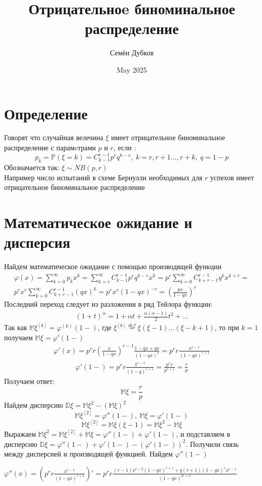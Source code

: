 \documentclass{article}
\title{Отрицательноe биноминальное распределение}
\author{Семён Дубков}
\date{May 2025}
\begin{document}
\maketitle
\fontsize{13}{15}\selectfont
\section{Определение}
Говорят что случайная велечина $\xi$ имеет отрицательное биноминальное распределение с парамeтрами $p$ и $r$, если :
\[
p_k = \mathbb{P}( \xi = k) = C_{k-1}^{r-1} p^rq^{k-r},\ k=r,r+1 \dots ,r+k, \ q = 1-p
\]
Обозначается так: $\xi \sim NB(p,r) $\\
Например число испытаний в схеме Бернулли необходимых для $r$ успехов имеет отрицательное биноминальное распределение

\section{Математическое ожидание и дисперсия}
Найдем математическое ожидание с помощью производящей функции
\begin{align*}
\varphi(x)=\sum_{k=0}^{\infty}p_kx^k = \sum_{k=r}^{\infty}C_{k-1}^{r-1}p^rq^{k-r}x^k=p^r\sum_{k=0}^{\infty}C_{k+r-1}^{r-1}q^kx^{k+r}=\\
p^rx^r\sum_{k=0}^{\infty}C_{k+r-1}^{r-1}(qx)^k=p^rx^r(1-qx)^{-r}=\left(\frac{px}{1-qx}\right)^r
\end{align*}
Последний переход следует из разложения в ряд Тейлора функции:
\begin{align*}
    (1+t)^{\alpha}=1+\alpha t+\frac{\alpha(\alpha-1)}{2}t^2+\dots
\end{align*}
Так как $\mathbb{M}\xi^{[k]}=\varphi^{(k)}(1-) $, где $\xi^{[k]}\overset{def}{=}\xi(\xi-1)\dots(\xi-k+1)$, то при $k=1$ получаем $\mathbb{M}\xi=\varphi'(1-)$
\begin{align*}
    \varphi'(x) = p^rr(\frac{x}{1-qx})^{r-1}\frac{1-qx+qx}{(1-qx)^2}=p^rr\frac{x^{r-1}}{(1-qx)^{r+1}}
\end{align*}
\begin{align*}
    \varphi'(1-)=p^rr\frac{1^{r-1}}{(1-q)^{r+1}}=\frac{p^rr}{p^{r+1}}=\frac{r}{p}
\end{align*}
Получаем ответ:
\[
\boxed{\mathbb{M}\xi=\frac{r}{p}}
\]
Найдем дисперсию $\mathbb{D\xi}=\mathbb{M}\xi^{2}-(\mathbb{M\xi})^2$
\[
\mathbb{M}\xi^{[2]}=\varphi''(1-),\ \mathbb{M}\xi=\varphi'(1-)
\]
\[
\mathbb{M}\xi^{[2]}=\mathbb{M}\xi(\xi-1)=\mathbb{M}\xi^2-\mathbb{M}\xi
\]
Выражаем $\mathbb{M}\xi^2 = \mathbb{M}\xi^{[2]}+\mathbb{M}\xi=\varphi''(1-)+\varphi'(1-)$, и подставляем в дисперсию $\mathbb{D\xi}=\varphi''(1-)+\varphi'(1-)-(\varphi'(1-))^2$. Получили связь между дисперсией и производящей функцией. Найдем $\varphi''(1-)$
\begin{center}
$\varphi''(x)=\left(p^rr\frac{x^{r-1}}{(1-qx)^{r+1}}\right)'=p^rr\frac{(r-1)x^{r-2}(1-qx)^{r+1}+q(r+1)(1-qx)^rx^{r-1}}{(1-qx)^{2r+2}}$    
\end{center}
\end{document}
